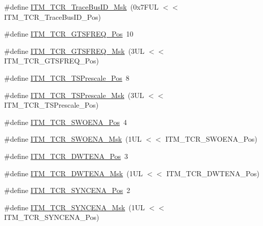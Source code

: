 \begin{DoxyCompactItemize}
\item 
\#define \mbox{\hyperlink{group___c_m_s_i_s___i_t_m_ga60c20bd9649d1da5a2be8e656ba19a60}{I\+T\+M\+\_\+\+T\+C\+R\+\_\+\+Trace\+Bus\+I\+D\+\_\+\+Msk}}~(0x7\+F\+U\+L $<$$<$ I\+T\+M\+\_\+\+T\+C\+R\+\_\+\+Trace\+Bus\+I\+D\+\_\+\+Pos)
\item 
\#define \mbox{\hyperlink{group___c_m_s_i_s___i_t_m_ga96c7c7cbc0d98426c408090b41f583f1}{I\+T\+M\+\_\+\+T\+C\+R\+\_\+\+G\+T\+S\+F\+R\+E\+Q\+\_\+\+Pos}}~10
\item 
\#define \mbox{\hyperlink{group___c_m_s_i_s___i_t_m_gade862cf009827f7f6748fc44c541b067}{I\+T\+M\+\_\+\+T\+C\+R\+\_\+\+G\+T\+S\+F\+R\+E\+Q\+\_\+\+Msk}}~(3\+U\+L $<$$<$ I\+T\+M\+\_\+\+T\+C\+R\+\_\+\+G\+T\+S\+F\+R\+E\+Q\+\_\+\+Pos)
\item 
\#define \mbox{\hyperlink{group___c_m_s_i_s___i_t_m_gad7bc9ee1732032c6e0de035f0978e473}{I\+T\+M\+\_\+\+T\+C\+R\+\_\+\+T\+S\+Prescale\+\_\+\+Pos}}~8
\item 
\#define \mbox{\hyperlink{group___c_m_s_i_s___i_t_m_ga7a723f71bfb0204c264d8dbe8cc7ae52}{I\+T\+M\+\_\+\+T\+C\+R\+\_\+\+T\+S\+Prescale\+\_\+\+Msk}}~(3\+U\+L $<$$<$ I\+T\+M\+\_\+\+T\+C\+R\+\_\+\+T\+S\+Prescale\+\_\+\+Pos)
\item 
\#define \mbox{\hyperlink{group___c_m_s_i_s___i_t_m_ga7a380f0c8078f6560051406583ecd6a5}{I\+T\+M\+\_\+\+T\+C\+R\+\_\+\+S\+W\+O\+E\+N\+A\+\_\+\+Pos}}~4
\item 
\#define \mbox{\hyperlink{group___c_m_s_i_s___i_t_m_ga97476cb65bab16a328b35f81fd02010a}{I\+T\+M\+\_\+\+T\+C\+R\+\_\+\+S\+W\+O\+E\+N\+A\+\_\+\+Msk}}~(1\+U\+L $<$$<$ I\+T\+M\+\_\+\+T\+C\+R\+\_\+\+S\+W\+O\+E\+N\+A\+\_\+\+Pos)
\item 
\#define \mbox{\hyperlink{group___c_m_s_i_s___i_t_m_ga30e83ebb33aa766070fe3d1f27ae820e}{I\+T\+M\+\_\+\+T\+C\+R\+\_\+\+D\+W\+T\+E\+N\+A\+\_\+\+Pos}}~3
\item 
\#define \mbox{\hyperlink{group___c_m_s_i_s___i_t_m_ga98ea1c596d43d3633a202f9ee746cf70}{I\+T\+M\+\_\+\+T\+C\+R\+\_\+\+D\+W\+T\+E\+N\+A\+\_\+\+Msk}}~(1\+U\+L $<$$<$ I\+T\+M\+\_\+\+T\+C\+R\+\_\+\+D\+W\+T\+E\+N\+A\+\_\+\+Pos)
\item 
\#define \mbox{\hyperlink{group___c_m_s_i_s___i_t_m_gaa93a1147a39fc63980d299231252a30e}{I\+T\+M\+\_\+\+T\+C\+R\+\_\+\+S\+Y\+N\+C\+E\+N\+A\+\_\+\+Pos}}~2
\item 
\#define \mbox{\hyperlink{group___c_m_s_i_s___i_t_m_gac89b74a78701c25b442105d7fe2bbefb}{I\+T\+M\+\_\+\+T\+C\+R\+\_\+\+S\+Y\+N\+C\+E\+N\+A\+\_\+\+Msk}}~(1\+U\+L $<$$<$ I\+T\+M\+\_\+\+T\+C\+R\+\_\+\+S\+Y\+N\+C\+E\+N\+A\+\_\+\+Pos)

\end{DoxyCompactItemize}
